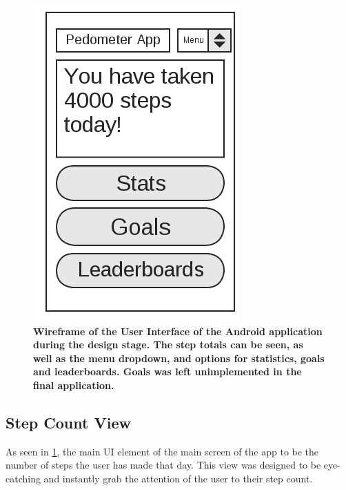 \documentclass{l4proj}
\begin{document}
\begin{figure}[H]
\centering
\includegraphics[scale=0.7]{images/diagrams/appwireframe.png}
\caption{\textbf{Wireframe of the User Interface of the Android application during the design stage. The step totals can be seen, as well as the menu dropdown, and options for statistics, goals and leaderboards. Goals was left unimplemented in the final application.}}
\label{design:appwireframe}
\end{figure}

\subsection{Step Count View}

As seen in \ref{design:appwireframe}, the main UI element of the main screen of the app to be the number of steps the user has made that day. This view was designed to be eye-catching and instantly grab the attention of the user to their step count.
\end{document}
